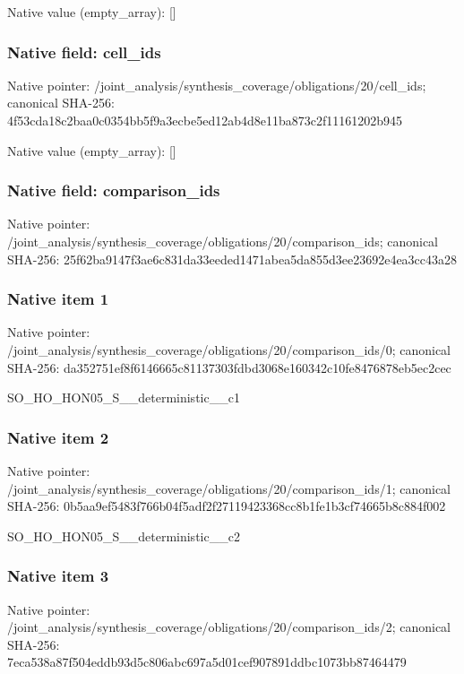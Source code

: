 \documentclass[10pt,a4paper]{article}
\begin{document}
Native value (empty\_\allowbreak{}array): []

\subsubsection{Native field: cell\_\allowbreak{}ids}
Native pointer: /joint\_\allowbreak{}analysis/synthesis\_\allowbreak{}coverage/obligations/20/cell\_\allowbreak{}ids; canonical SHA-256: 4f53cda18c2baa0c0354bb5f9a3ecbe5ed12ab4d8e11ba873c2f11161202b945

Native value (empty\_\allowbreak{}array): []

\subsubsection{Native field: comparison\_\allowbreak{}ids}
Native pointer: /joint\_\allowbreak{}analysis/synthesis\_\allowbreak{}coverage/obligations/20/comparison\_\allowbreak{}ids; canonical SHA-256: 25f62ba9147f3ae6c831da33eeded1471abea5da855d3ee23692e4ea3cc43a28

\subsubsection{Native item 1}
Native pointer: /joint\_\allowbreak{}analysis/synthesis\_\allowbreak{}coverage/obligations/20/comparison\_\allowbreak{}ids/0; canonical SHA-256: da352751ef8f6146665c81137303fdbd3068e160342c10fe8476878eb5ec2cec

\begingroup\raggedright\sloppy SO\_\allowbreak{}HO\_\allowbreak{}HON05\_\allowbreak{}S\_\allowbreak{}\_\allowbreak{}deterministic\_\allowbreak{}\_\allowbreak{}c1\par\endgroup

\subsubsection{Native item 2}
Native pointer: /joint\_\allowbreak{}analysis/synthesis\_\allowbreak{}coverage/obligations/20/comparison\_\allowbreak{}ids/1; canonical SHA-256: 0b5aa9ef5483f766b04f5adf2f27119423368cc8b1fe1b3cf74665b8c884f002

\begingroup\raggedright\sloppy SO\_\allowbreak{}HO\_\allowbreak{}HON05\_\allowbreak{}S\_\allowbreak{}\_\allowbreak{}deterministic\_\allowbreak{}\_\allowbreak{}c2\par\endgroup

\subsubsection{Native item 3}
Native pointer: /joint\_\allowbreak{}analysis/synthesis\_\allowbreak{}coverage/obligations/20/comparison\_\allowbreak{}ids/2; canonical SHA-256: 7eca538a87f504eddb93d5c806abc697a5d01cef907891ddbc1073bb87464479
\end{document}
